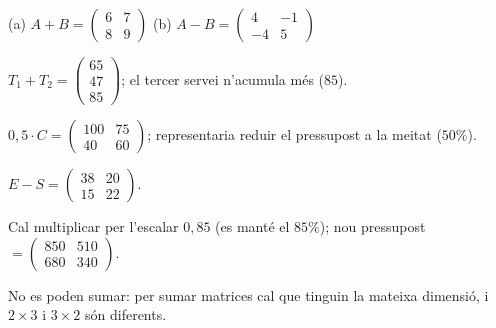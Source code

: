 \begin{solucions}
\begin{sollist}
  \item (a) $A+B=\begin{pmatrix} 6 & 7 \\ 8 & 9 \end{pmatrix}$ \quad
        (b) $A-B=\begin{pmatrix} 4 & -1 \\ -4 & 5 \end{pmatrix}$
  \item $T_1+T_2=\begin{pmatrix} 65 \\ 47 \\ 85 \end{pmatrix}$;
        \;el tercer servei n'acumula més ($85$).
  \item $0{,}5\cdot C=\begin{pmatrix} 100 & 75 \\ 40 & 60 \end{pmatrix}$;
        \;representaria reduir el pressupost a la meitat ($50\%$).
  \item $E-S=\begin{pmatrix} 38 & 20 \\ 15 & 22 \end{pmatrix}$.
  \item Cal multiplicar per l'escalar $0{,}85$ (es manté el $85\%$);
        \;nou pressupost $=\begin{pmatrix} 850 & 510 \\ 680 & 340 \end{pmatrix}$.
  \item No es poden sumar: per sumar matrices cal que tinguin la mateixa
        dimensió, i $2\times 3$ i $3\times 2$ són diferents.
\end{sollist}
\end{solucions}
